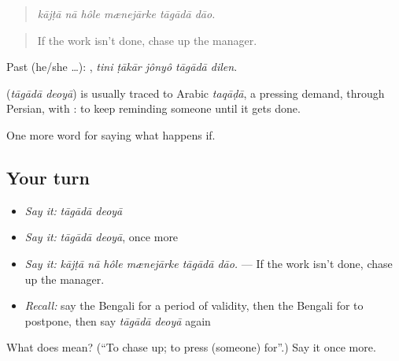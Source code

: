 \begin{quote}
\emph{kājṭā nā hôle mænejārke tāgādā dāo.}
\end{quote}

\begin{quote}
If the work isn't done, chase up the manager.
\end{quote}

Past (he/she …):     , \emph{tini ṭākār jônyô tāgādā dilen}.

\begin{cousinweb}
\textbf{ } (\emph{tāgādā deoyā}) is usually traced to Arabic \emph{taqāḍā}, a pressing demand, through Persian, with : to keep reminding someone until it gets done.
\end{cousinweb}

\begin{grammarlens}[title={What you've built}]
One more word for saying what happens if.
\end{grammarlens}

\subsection*{Your turn}
\begin{itemize}
\raggedright
  \item \emph{Say it:} \emph{tāgādā deoyā}
  \item \emph{Say it:} \emph{tāgādā deoyā}, once more
  \item \emph{Say it:} \emph{kājṭā nā hôle mænejārke tāgādā dāo.} — If the work isn't done, chase up the manager.
  \item \emph{Recall:} say the Bengali for a period of validity, then the Bengali for to postpone, then say \emph{tāgādā deoyā} again
\end{itemize}

\begin{tcolorbox}[breakable,colback=teal!4,colframe=teal!35!black,title={Before you move on}]
What does   mean? (\textquotedblleft{}To chase up; to press (someone) for\textquotedblright{}.) Say it once more.
\end{tcolorbox}
